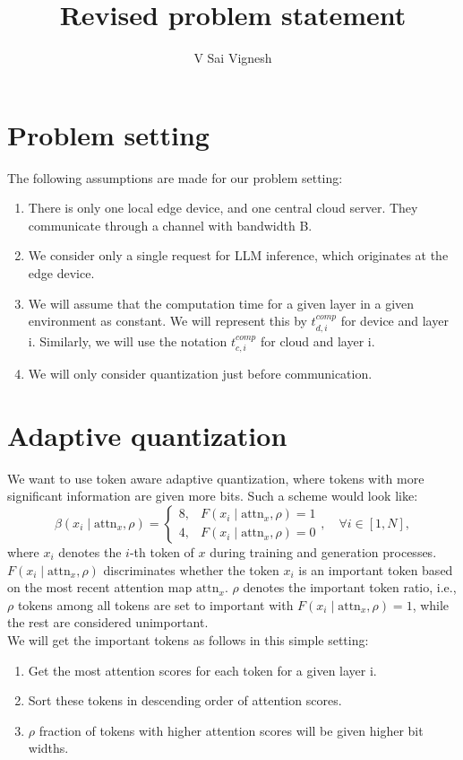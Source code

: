 \documentclass{article}
\title{Revised problem statement}
\author{V Sai Vignesh}
\date{\displaydate{Meet 4}}
\begin{document}
\maketitle

\section{Problem setting}
The following assumptions are made for our problem setting:
\begin{enumerate}
    \item There is only one local edge device, and one central cloud server. They communicate through a channel with bandwidth B. 
    \item We consider only a single request for LLM inference, which originates at the edge device. 
    \item We will assume that the computation time for a given layer in a given environment as constant. We will represent this by $t^{comp}_{d, i}$ for device and layer i. Similarly, we will use the notation $t^{comp}_{c, i}$ for cloud and layer i.
    \item We will only consider quantization just before communication. 
\end{enumerate}
\section{Adaptive quantization}
We want to use token aware adaptive quantization, where tokens with more significant information are given more bits. Such a scheme would look like:
\[
\beta(x_i \mid \text{attn}_x, \rho) =
\begin{cases} 
8, & F(x_i \mid \text{attn}_x, \rho) = 1 \\
4, & F(x_i \mid \text{attn}_x, \rho) = 0
\end{cases}, \quad \forall i \in [1, N],
\]
where \(x_i\) denotes the \(i\)-th token of \(x\) during training and generation processes. \(F(x_i \mid \text{attn}_x, \rho)\) discriminates whether the token \(x_i\) is an important token based on the most recent attention map \(\text{attn}_x\). \(\rho\) denotes the important token ratio, i.e., \(\rho\) tokens among all tokens are set to important with \(F(x_i \mid \text{attn}_x, \rho) = 1\), while the rest are considered unimportant.\\
We will get the important tokens as follows in this simple setting:
\begin{enumerate}
    \item Get the most attention scores for each token for a given layer i.
    \item Sort these tokens in descending order of attention scores. 
    \item $ \rho $ fraction of tokens with higher attention scores will be given higher bit widths. 
\end{enumerate}
\end{document}
